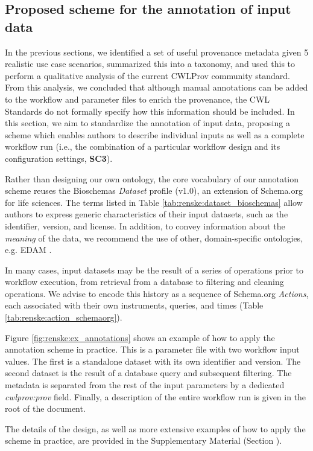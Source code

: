 \subsection{Proposed scheme for the annotation of input data}


In the previous sections, we identified a set of useful provenance metadata given 5 realistic use case scenarios, summarized this into a taxonomy, and used this to perform a qualitative analysis of the current CWLProv community standard. From this analysis, we concluded that although manual annotations can be added to the workflow and parameter files to enrich the provenance, the CWL Standards do not formally specify how this information should be included. In this section, we aim to standardize the annotation of input data, proposing a scheme which enables authors to describe individual inputs as well as a complete workflow run (i.e., the combination of a particular workflow design and its configuration settings, \textbf{SC3}). 

Rather than designing our own ontology, the core vocabulary of our annotation scheme reuses the Bioschemas \citep{Michel_2018} \emph{Dataset} profile (v1.0), an extension of Schema.org \cite{guhaBigDataMakes2015} for life sciences. The terms listed in Table \ref{tab:renske:dataset_bioschemas} allow authors to express generic characteristics of their input datasets, such as the identifier, version, and license. In addition, to convey information about the \emph{meaning} of the data, we recommend the use of other, domain-specific ontologies, e.g. EDAM \cite{Ison2013}. 

In many cases, input datasets may be the result of a series of operations prior to workflow execution, from retrieval from a database to filtering and cleaning operations. We advise to encode this history as a sequence of Schema.org \emph{Actions}, each associated with their own instruments, queries, and times (Table \ref{tab:renske:action_schemaorg}). 


Figure \ref{fig:renske:ex_annotations} shows an example of how to apply the annotation scheme in practice. This is a parameter file with two workflow input values. The first is a standalone dataset with its own identifier and version. The second dataset is the result of a database query and subsequent filtering. The metadata is separated from the rest of the input parameters by a dedicated \emph{cwlprov:prov} field. Finally, a description of the entire workflow run is given in the root of the document.

The details of the design, as well as more extensive examples of how to apply the scheme in practice, are provided in the Supplementary Material (Section \emph{}).


